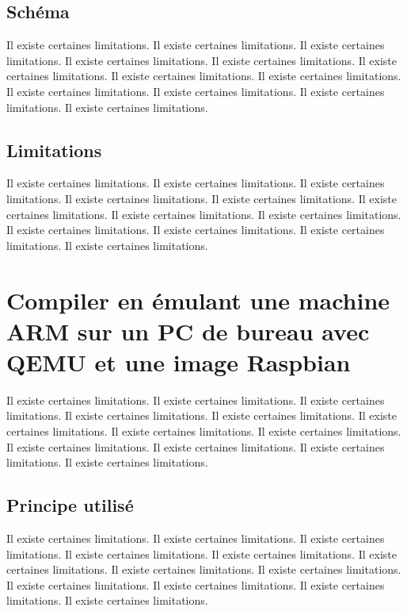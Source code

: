 \documentclass[11pt,a4paper,oneside]{report}
\begin{document}
\subsection{Schéma}

Il existe certaines limitations.
Il existe certaines limitations.
Il existe certaines limitations.
Il existe certaines limitations.
Il existe certaines limitations.
Il existe certaines limitations.
Il existe certaines limitations.
Il existe certaines limitations.
Il existe certaines limitations.
Il existe certaines limitations.
Il existe certaines limitations.
Il existe certaines limitations.
\subsection{Limitations}

Il existe certaines limitations.
Il existe certaines limitations.
Il existe certaines limitations.
Il existe certaines limitations.
Il existe certaines limitations.
Il existe certaines limitations.
Il existe certaines limitations.
Il existe certaines limitations.
Il existe certaines limitations.
Il existe certaines limitations.
Il existe certaines limitations.
Il existe certaines limitations.



\section{Compiler en émulant une machine ARM sur un PC de bureau avec QEMU et une image Raspbian}

Il existe certaines limitations.
Il existe certaines limitations.
Il existe certaines limitations.
Il existe certaines limitations.
Il existe certaines limitations.
Il existe certaines limitations.
Il existe certaines limitations.
Il existe certaines limitations.
Il existe certaines limitations.
Il existe certaines limitations.
Il existe certaines limitations.
Il existe certaines limitations.
\subsection{Principe utilisé}

Il existe certaines limitations.
Il existe certaines limitations.
Il existe certaines limitations.
Il existe certaines limitations.
Il existe certaines limitations.
Il existe certaines limitations.
Il existe certaines limitations.
Il existe certaines limitations.
Il existe certaines limitations.
Il existe certaines limitations.
Il existe certaines limitations.
Il existe certaines limitations.
\end{document}

